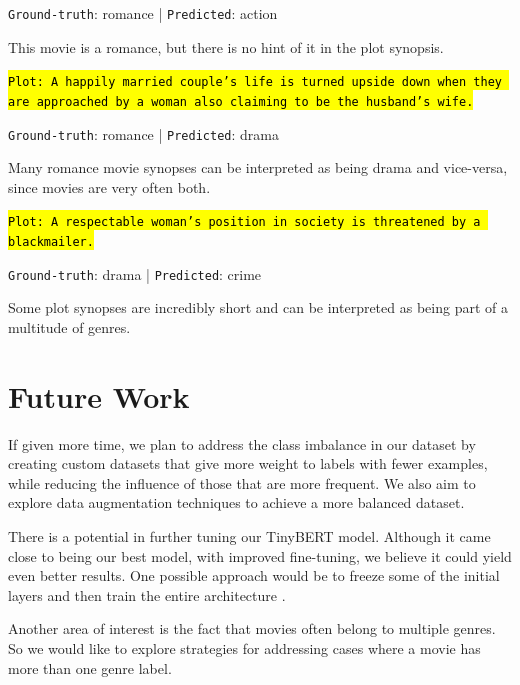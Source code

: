 \documentclass[twocolumn]{article}
\begin{document}
\texttt{Ground-truth}: romance | \texttt{Predicted}: action

This movie is a romance, but there is no hint of it in the plot synopsis.


\hl{\texttt{Plot: A happily married couple's life is turned upside down when they are approached by a woman also claiming to be the husband's wife.}}

\texttt{Ground-truth}: romance | \texttt{Predicted}: drama

Many romance movie synopses can be interpreted as being drama and vice-versa, since movies are very often both.

\hl{\texttt{Plot: A respectable woman's position in society is threatened by a blackmailer.}}

\texttt{Ground-truth}: drama | \texttt{Predicted}: crime

Some plot synopses are incredibly short and can be interpreted as being part of a multitude of genres.


\vspace{-0.3cm}
\section{Future Work}
\vspace{-0.3cm}
If given more time, we plan to address the class imbalance in our dataset by creating custom datasets that give more weight to labels with fewer examples, while reducing the influence of those that are more frequent. We also aim to explore data augmentation techniques to achieve a more balanced dataset.

There is a potential in further tuning our TinyBERT model. Although it came close to being our best model, with improved fine-tuning, we believe it could yield even better results. One possible approach would be to freeze some of the initial layers and then train the entire architecture \cite{zhao2022methods}. 

Another area of interest is the fact that movies often belong to multiple genres. So we would like to explore strategies for addressing cases where a movie has more than one genre label.
\newpage
\small


\end{document}
